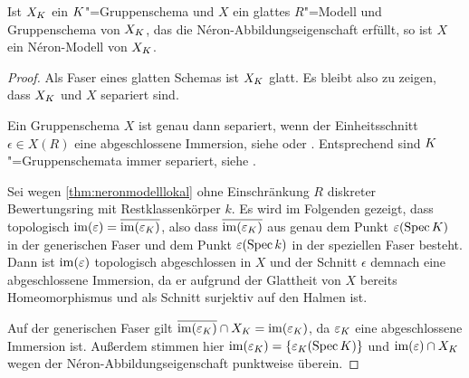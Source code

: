 \begin{Lemma}\label{nerongruppenschemaglatt}
  Ist $X_{K}$ ein $K$"=Gruppenschema und $X$ ein
  glattes $R$"=Modell und Gruppenschema von $X_{K}$, das die
  Néron-Abbildungseigenschaft erfüllt, so ist $X$ ein Néron-Modell von $X_{K}$.
  \begin{proof}
    Als Faser eines glatten Schemas ist $X_{K}$ glatt. Es bleibt also
    zu zeigen, dass $X_{K}$ und $X$ separiert sind.
    
    Ein Gruppenschema $X$ ist genau dann separiert, wenn der
    Einheitsschnitt ${\epsilon\in X(R)}$ eine abgeschlossene
    Immersion, siehe
    \cite[Lemma~38.6.1]{stacksproject} oder \cite[Lemma~7.1/2]{neron}.
    Entsprechend sind $K$"=Gruppenschemata immer separiert, siehe
    \cite[Lemma~38.7.3]{stacksproject}. 

    Sei wegen \ref{thm:neronmodelllokal} ohne Einschränkung $R$ diskreter
    Bewertungsring mit Restklassenkörper $k$.    
    Es wird im Folgenden gezeigt, dass topologisch
    $\operatorname{im}(\varepsilon)=\overline{\operatorname{im}(\varepsilon_{K})}$,
    also dass $\overline{\operatorname{im}(\varepsilon_{K})}$ aus genau dem Punkt
    $\varepsilon(\operatorname{Spec}K)$ in der generischen Faser und dem Punkt
    $\varepsilon(\operatorname{Spec} k)$ in der speziellen Faser besteht.
    Dann ist $\operatorname{im}(\varepsilon)$ topologisch abgeschlossen in $X$ und der
    Schnitt $\epsilon$ demnach eine abgeschlossene Immersion, da er
    aufgrund der Glattheit von $X$ bereits Homeomorphismus und als
    Schnitt surjektiv auf den Halmen ist.
    
    Auf der generischen Faser gilt
    $\overline{\operatorname{im}(\varepsilon_{K})}\cap X_{K}=\operatorname{im}(\varepsilon_{K})$,
    da $\varepsilon_{K}$ eine abgeschlossene Immersion ist.
    Außerdem stimmen hier $\operatorname{im}(\varepsilon_{K})=\{\varepsilon_{K}(\operatorname{Spec}K)\}$
    und $\operatorname{im}(\varepsilon)\cap X_{K}$ wegen der Néron-Abbildungseigenschaft punktweise
    überein.


\end{proof}
\end{Lemma}
